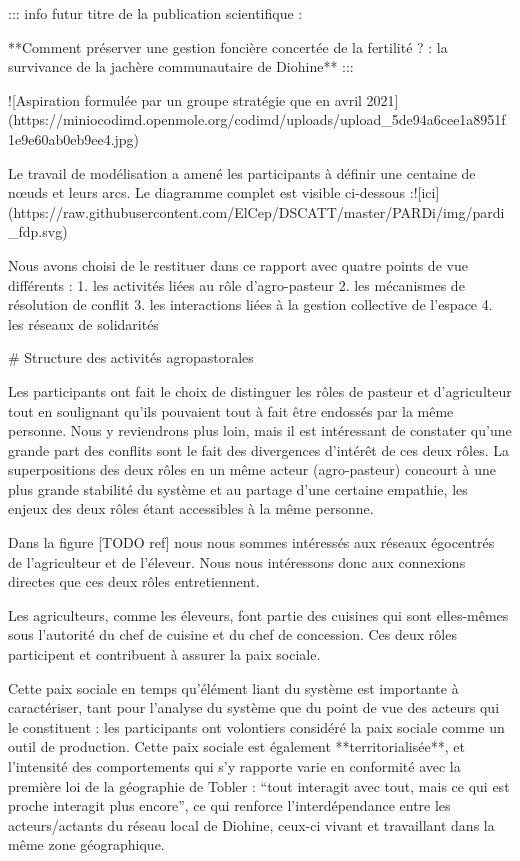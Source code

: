 ::: info
futur titre de la publication scientifique : 

**Comment préserver une gestion foncière concertée de la fertilité ? : la survivance de la jachère communautaire de Diohine**
:::


![Aspiration formulée par un groupe stratégie que en avril 2021](https://miniocodimd.openmole.org/codimd/uploads/upload_5de94a6cee1a8951f1e9e60ab0eb9ee4.jpg)




Le travail de modélisation a amené les participants à définir une centaine de nœuds et leurs arcs. Le diagramme complet est visible ci-dessous :![ici](https://raw.githubusercontent.com/ElCep/DSCATT/master/PARDi/img/pardi_fdp.svg)

Nous avons choisi de le restituer dans ce rapport avec quatre points de vue différents : 
1. les activités liées au rôle d'agro-pasteur
2. les mécanismes de résolution de conflit
3. les interactions liées à la gestion collective de l'espace
4. les réseaux de solidarités

# Structure des activités agropastorales 

Les participants ont fait le choix de distinguer les rôles de pasteur et d'agriculteur tout en soulignant qu'ils pouvaient tout à fait être endossés par la même personne. Nous y reviendrons plus loin, mais il est intéressant de constater qu'une grande part des conflits sont le fait des divergences d'intérêt de ces deux rôles. La superpositions des deux rôles en un même acteur (agro-pasteur) concourt à une plus grande stabilité du système et au partage d'une certaine empathie, les enjeux des deux rôles étant accessibles à la même personne.

Dans la figure [TODO ref] nous nous sommes intéressés aux réseaux égocentrés de l'agriculteur et de l'éleveur. Nous nous intéressons donc aux connexions directes que ces deux rôles entretiennent. 

Les agriculteurs, comme les éleveurs, font partie des cuisines qui sont elles-mêmes sous l'autorité du chef de cuisine et du chef de concession. Ces deux rôles participent et contribuent à assurer la paix sociale. 

Cette paix sociale en temps qu'élément liant du système est importante à caractériser, tant pour l'analyse du système que du point de vue des acteurs qui le constituent : les participants ont volontiers considéré la paix sociale comme un outil de production. Cette paix sociale est également **territorialisée**, et l'intensité des comportements qui s'y rapporte varie en conformité avec la première loi de la géographie de Tobler : “tout interagit avec tout, mais ce qui est proche interagit plus encore”, ce qui renforce l'interdépendance entre les acteurs/actants du réseau local de Diohine, ceux-ci vivant et travaillant dans la même zone géographique.

